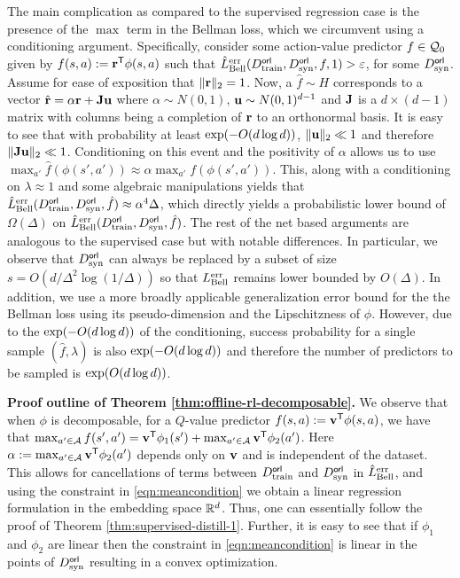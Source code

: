 The main complication as compared to the supervised regression case is the presence of the $\max$ term in the Bellman loss, which we circumvent using a conditioning argument. Specifically, consider some action-value predictor $f\in \mathcal{Q}_0$ given by $f(s, a) := {\mathbf{r}}^{\sf T}\phi(s,a)$ such that $\hat{L}^{\textnormal{err}}_{\textnormal{Bell}}(D^{\sf orl}_{\textnormal{train}}, D^{\sf orl}_{\textnormal{syn}}, f, 1) > {\varepsilon}$, for some $D^{\sf orl}_{\textnormal{syn}}$. Assume for ease of exposition that $\|{\mathbf{r}}\|_2 = 1$. Now, a $\hat{f} \sim H$ corresponds to a vector $\hat{{\mathbf{r}}} = \alpha{\mathbf{r}} + \mathbf{J}{\mathbf{u}}$ where $\alpha \sim N(0,1)$, ${\mathbf{u}} \sim N(0,1)^{d-1}$ and $\mathbf{J}$ is a $d\times (d-1)$ matrix with columns being a completion of ${\mathbf{r}}$ to an orthonormal basis. It is easy to see that with probability at least $\textnormal{exp}(-{O(d\log d)})$, $\|{\mathbf{u}}\|_2 \ll 1$ and therefore $\|\mathbf{J}{\mathbf{u}}\|_2 \ll 1$. Conditioning on this event and the positivity of $\alpha$ allows us to use $\max_{a'}\hat{f}(\phi(s',a')) \approx \alpha\max_{a'}f(\phi(s',a'))$. This, along with a conditioning on $\lambda \approx 1$ and some algebraic manipulations yields that $\hat{L}^{\textnormal{err}}_{\textnormal{Bell}}(D^{\sf orl}_{\textnormal{train}}, D^{\sf orl}_{\textnormal{syn}}, \hat{f}) \approx \alpha^4 \Delta$, which directly yields a probabilistic lower bound of $\Omega(\Delta)$ on $\hat{L}^{\textnormal{err}}_{\textnormal{Bell}}(D^{\sf orl}_{\textnormal{train}}, D^{\sf orl}_{\textnormal{syn}}, \hat{f})$. 
The rest of the net based arguments are analogous to the supervised case but with notable differences. 
{In particular, we observe that $D_{\textnormal{syn}}^{\sf orl}$ can always be replaced by a subset of size $s= O(d/\Delta^2 \log{(1/\Delta)})$ so that $L_{\textnormal{Bell}}^{\textnormal{err}}$ remains lower bounded by $O(\Delta)$.}
In addition, we use a more broadly applicable generalization error bound for the the Bellman loss using its pseudo-dimension and the Lipschitzness of $\phi$. 
However, due to the $\textnormal{exp}(-{O(d\log d)})$ of the conditioning, success probability for a single sample $(\hat{f}, \lambda)$ is also $\textnormal{exp}(-{O(d\log d)})$ and therefore the number of predictors to be sampled is $\textnormal{exp}({O(d\log d)})$.

{\bf Proof outline of Theorem \ref{thm:offline-rl-decomposable}.} We observe that when $\phi$ is decomposable, for a $Q$-value predictor $f(s,a) := {\mathbf{v}}^{\sf T}\phi(s,a)$, we have that $\max_{a'\in \mathcal{A}}f(s',a') = {\mathbf{v}}^{\sf T}\phi_1(s') + \max_{a'\in \mathcal{A}}{\mathbf{v}}^{\sf T}\phi_2(a')$. Here $\alpha := \max_{a'\in \mathcal{A}}{\mathbf{v}}^{\sf T}\phi_2(a')$ depends only on ${\mathbf{v}}$ and is independent of the dataset. This allows for cancellations of terms between $D^{\sf orl}_{\textnormal{train}}$ and $D^{\sf orl}_{\textnormal{syn}}$ in $\hat{L}^{\textnormal{err}}_{\textnormal{Bell}}$, and using the constraint in \eqref{eqn:meancondition} we obtain a linear regression formulation in the embedding space $\mathbb{R}^d$. Thus, one can essentially follow the proof of Theorem \ref{thm:supervised-distill-1}. Further, it is easy to see that if $\phi_1$ and $\phi_2$ are linear then the constraint in \eqref{eqn:meancondition} is linear in the points of $D^{\sf orl}_{\textnormal{syn}}$ resulting in a convex optimization.